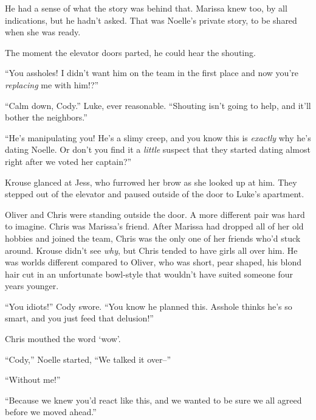 He had a sense of what the story was behind that.  Marissa knew too, by all indications, but he hadn't asked.  That was Noelle's private story, to be shared when she was ready.



The moment the elevator doors parted, he could hear the shouting.



``You assholes!  I didn't want him on the team in the first place and now you're \emph{replacing} me with him!?''



``Calm down, Cody.''  Luke, ever reasonable.  ``Shouting isn't going to help, and it'll bother the neighbors.''



``He's manipulating you!  He's a slimy creep, and you know this is \emph{exactly} why he's dating Noelle.  Or don't you find it a\emph{ little} suspect that they started dating almost right after we voted her captain?''



Krouse glanced at Jess, who furrowed her brow as she looked up at him.  They stepped out of the elevator and paused outside of the door to Luke's apartment.



Oliver and Chris were standing outside the door.  A more different pair was hard to imagine.  Chris was Marissa's friend.  After Marissa had dropped all of her old hobbies and joined the team, Chris was the only one of her friends who'd stuck around.  Krouse didn't see \emph{why}, but Chris tended to have girls all over him.  He was worlds different compared to Oliver, who was short, pear shaped, his blond hair cut in an unfortunate bowl-style that wouldn't have suited someone four years younger.



``You idiots!'' Cody swore.  ``You know he planned this.  Asshole thinks he's so smart, and you just feed that delusion!''



Chris mouthed the word `wow'.



``Cody,'' Noelle started, ``We talked it over--''



``Without me!''



``Because we knew you'd react like this, and we wanted to be sure we all agreed before we moved ahead.''



